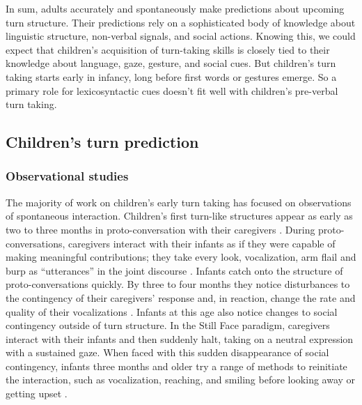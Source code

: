 \documentclass[authoryear, 12pt]{elsarticle}
\begin{document}
In sum, adults accurately and spontaneously make predictions about upcoming turn structure. Their predictions rely on a sophisticated body of knowledge about linguistic structure, non-verbal signals, and social actions. Knowing this, we could expect that children's acquisition of turn-taking skills is closely tied to their knowledge about language, gaze, gesture, and social cues. But children's turn taking starts early in infancy, long before first words or gestures emerge. So a primary role for lexicosyntactic cues doesn't fit well with children's pre-verbal turn taking.

\subsection{Children's turn prediction}

\subsubsection{Observational studies}

The majority of work on children's early turn taking has focused on observations of spontaneous interaction. Children's first turn-like structures appear as early as two to three months in proto-conversation with their caregivers \citep{bruner1975, bruner1985}. During proto-conversations, caregivers interact with their infants as if they were capable of making meaningful contributions; they take every look, vocalization, arm flail and burp as ``utterances'' in the joint discourse \citep{bateson1975, snow1977, jaffe2001}. Infants catch onto the structure of proto-conversations quickly. By three to four months they notice disturbances to the contingency of their caregivers' response and, in reaction, change the rate and quality of their vocalizations \citep{k-bloom1988, masataka1993}. Infants at this age also notice changes to social contingency outside of turn structure. In the Still Face paradigm, caregivers interact with their infants and then suddenly halt, taking on a neutral expression with a sustained gaze. When faced with this sudden disappearance of social contingency, infants three months and older try a range of methods to reinitiate the interaction, such as vocalization, reaching, and smiling before looking away or getting upset \citep{rochat1998, toda1993}.
\end{document}
